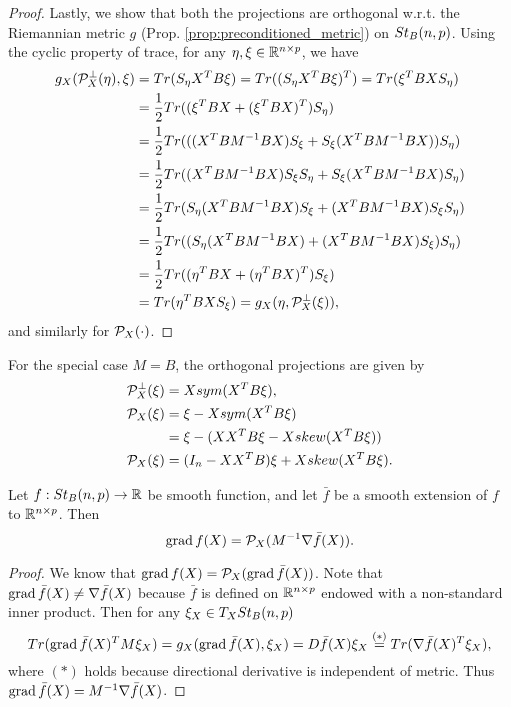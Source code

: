 \documentclass[11pt,a4paper]{article}
\begin{document}
\begin{proof}
Lastly, we show that both the projections are orthogonal w.r.t. the Riemannian metric $g$ (Prop. \ref{prop:preconditioned_metric}) on $St_B(n,p)$. Using the cyclic property of trace, for any $\eta,\xi\in\mathbb{R}^{n\times p}$, we have
\begin{align*}
g_X(\mathcal{P}^\perp_X(\eta),\xi) &= Tr(S_\eta X^T B \xi) = Tr((S_\eta X^T B \xi)^T) = Tr(\xi^T B X S_\eta) \\
&= \frac{1}{2} Tr((\xi^T B X + (\xi^T B X)^T) S_\eta) \\
&= \frac{1}{2} Tr(((X^TBM^{-1}BX)S_\xi + S_\xi(X^TBM^{-1}BX)) S_\eta) \\
&= \frac{1}{2} Tr((X^TBM^{-1}BX)S_\xi S_\eta + S_\xi(X^TBM^{-1}BX) S_\eta) \\
&= \frac{1}{2} Tr(S_\eta(X^TBM^{-1}BX)S_\xi + (X^TBM^{-1}BX)S_\xi S_\eta) \\
&= \frac{1}{2} Tr((S_\eta(X^TBM^{-1}BX) + (X^TBM^{-1}BX)S_\xi )S_\eta) \\
&= \frac{1}{2} Tr((\eta^T B X + (\eta^T B X)^T) S_\xi) \\
&= Tr(\eta^T B X S_\xi) = g_X(\eta,\mathcal{P}^\perp_X(\xi)),
\end{align*}
and similarly for $\mathcal{P}_X(\cdot)$.
\end{proof}

\begin{remark}\label{remark:unpreconditioned_Riemannian_gradient}
For the special case $M = B$, the orthogonal projections are given by
\begin{align*}
\mathcal{P}^\perp_X(\xi) &= Xsym(X^TB\xi),\\
\mathcal{P}_X(\xi) &= \xi - Xsym(X^TB\xi) \nonumber\\
&= \xi - (XX^TB\xi - Xskew(X^TB\xi))\nonumber\\
\mathcal{P}_X(\xi) &= (I_n - XX^TB)\xi + Xskew(X^TB\xi).
\end{align*}
\end{remark}

\begin{proposition}
Let $f:St_B(n,p)\rightarrow \mathbb{R}$ be smooth function, and let $\bar{f}$ be a smooth extension of $f$ to $\mathbb{R}^{n\times p}$. Then
\begin{equation}
\text{grad}\, f(X) = \mathcal{P}_X(M^{-1}\nabla \bar{f}(X)).
\end{equation}
\end{proposition}

\begin{proof}
We know that $\text{grad}\, f(X) = \mathcal{P}_X(\text{grad}\,\bar{f}(X))$. Note that $\text{grad}\,\bar{f}(X)\neq\nabla\bar{f}(X)$ because $\bar{f}$ is defined on $\mathbb{R}^{n\times p}$ endowed with a non-standard inner product. Then for any $\xi_X\in T_XSt_B(n,p)$
\begin{equation*}
Tr(\text{grad}\,\bar{f}(X)^TM\xi_X) = g_X(\text{grad}\,\bar{f}(X), \xi_X) = D\bar{f}(X)\xi_X \overset{(*)}{=} Tr(\nabla\bar{f}(X)^T\xi_X),
\end{equation*}
where $(*)$ holds because directional derivative is independent of metric. Thus $\text{grad}\,\bar{f}(X) = M^{-1}\nabla\bar{f}(X)$.
\end{proof}
\end{document}
